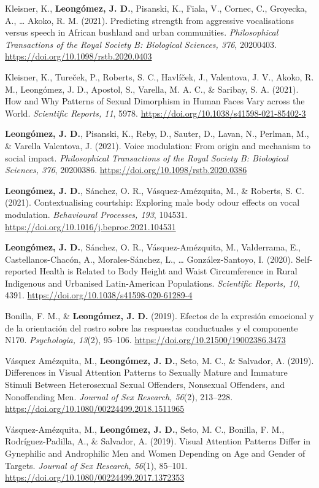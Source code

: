 \documentclass[11pt,a4paper,]{awesome-cv}
\begin{document}
Kleisner, K., \textbf{Leongómez, J. D.}, Pisanski, K., Fiala, V.,
Cornec, C., Groyecka, A., \ldots{} Akoko, R. M. (2021). Predicting
strength from aggressive vocalisations versus speech in African bushland
and urban communities. \emph{Philosophical Transactions of the Royal
Society B: Biological Sciences, 376}, 20200403.
\url{https://doi.org/10.1098/rstb.2020.0403}

Kleisner, K., Tureček, P., Roberts, S. C., Havlíček, J., Valentova, J.
V., Akoko, R. M., Leongómez, J. D., Apostol, S., Varella, M. A. C., \&
Saribay, S. A. (2021). How and Why Patterns of Sexual Dimorphism in
Human Faces Vary across the World. \emph{Scientific Reports, 11}, 5978.
\url{https://doi.org/10.1038/s41598-021-85402-3}

\textbf{Leongómez, J. D.}, Pisanski, K., Reby, D., Sauter, D., Lavan,
N., Perlman, M., \& Varella Valentova, J. (2021). Voice modulation: From
origin and mechanism to social impact. \emph{Philosophical Transactions
of the Royal Society B: Biological Sciences, 376}, 20200386.
\url{https://doi.org/10.1098/rstb.2020.0386}

\textbf{Leongómez, J. D.}, Sánchez, O. R., Vásquez-Amézquita, M., \&
Roberts, S. C. (2021). Contextualising courtship: Exploring male body
odour effects on vocal modulation. \emph{Behavioural Processes, 193},
104531. \url{https://doi.org/10.1016/j.beproc.2021.104531}

\textbf{Leongómez, J. D.}, Sánchez, O. R., Vásquez-Amézquita, M.,
Valderrama, E., Castellanos-Chacón, A., Morales-Sánchez, L., \ldots{}
González-Santoyo, I. (2020). Self-reported Health is Related to Body
Height and Waist Circumference in Rural Indigenous and Urbanised
Latin-American Populations. \emph{Scientific Reports, 10}, 4391.
\url{https://doi.org/10.1038/s41598-020-61289-4}

Bonilla, F. M., \& \textbf{Leongómez, J. D.} (2019). Efectos de la
expresión emocional y de la orientación del rostro sobre las respuestas
conductuales y el componente N170. \emph{Psychologia, 13}(2), 95--106.
\url{https://doi.org/10.21500/19002386.3473}

Vásquez Amézquita, M., \textbf{Leongómez, J. D.}, Seto, M. C., \&
Salvador, A. (2019). Differences in Visual Attention Patterns to
Sexually Mature and Immature Stimuli Between Heterosexual Sexual
Offenders, Nonsexual Offenders, and Nonoffending Men. \emph{Journal of
Sex Research, 56}(2), 213--228.
\url{https://doi.org/10.1080/00224499.2018.1511965}

Vásquez-Amézquita, M., \textbf{Leongómez, J. D.}, Seto, M. C., Bonilla,
F. M., Rodríguez-Padilla, A., \& Salvador, A. (2019). Visual Attention
Patterns Differ in Gynephilic and Androphilic Men and Women Depending on
Age and Gender of Targets. \emph{Journal of Sex Research, 56}(1),
85--101. \url{https://doi.org/10.1080/00224499.2017.1372353}
\end{document}
